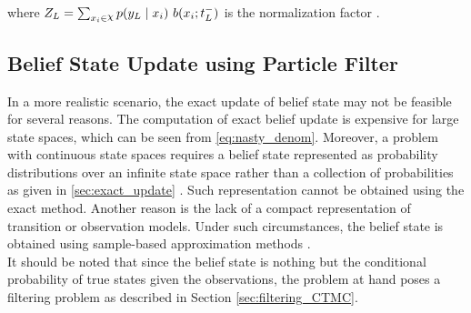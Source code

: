 where $ Z_{L} = \sum_{x_{i}\in \rchi} p(y_{L} \mid x_{i})\ b(x_{i}; t_{L}^{-}) $ is the normalization factor \cite{article}.

\subsection{Belief State Update using Particle Filter}
\label{sec:particle_filter}
In a more realistic scenario, the exact update of belief state may not be feasible for several reasons. The computation of exact belief update is expensive for large state spaces, which can be seen from \autoref{eq:nasty_denom}. Moreover, a problem with continuous state spaces requires a belief state represented as probability distributions over an infinite state space rather than a collection of probabilities as given in \cref{sec:exact_update} \cite{Carlo1904}. Such representation cannot be obtained using the exact method. Another reason is the lack of a compact representation of transition or observation models. Under such circumstances, the belief state is obtained using sample-based approximation methods \cite{Carlo1904}. \\
It should be noted that since the belief state is nothing but the conditional probability of true states given the observations, the problem at hand poses a filtering problem as described in Section \ref{sec:filtering_CTMC}.

